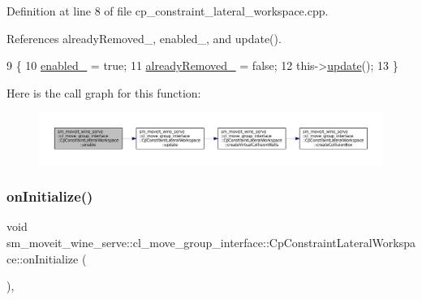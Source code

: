 Definition at line 8 of file cp\+\_\+constraint\+\_\+lateral\+\_\+workspace.\+cpp.



References already\+Removed\+\_\+, enabled\+\_\+, and update().


\begin{DoxyCode}
9         \{
10             \hyperlink{classsm__moveit__wine__serve_1_1cl__move__group__interface_1_1CpConstraintLateralWorkspace_a98fd9192d4b36e1b416ce7d90536c8de}{enabled\_} = \textcolor{keyword}{true};
11             \hyperlink{classsm__moveit__wine__serve_1_1cl__move__group__interface_1_1CpConstraintLateralWorkspace_aa48cf2bb345e79ba15e0f221f26f7df5}{alreadyRemoved\_} = \textcolor{keyword}{false};
12             this->\hyperlink{classsm__moveit__wine__serve_1_1cl__move__group__interface_1_1CpConstraintLateralWorkspace_a76692ba49429efb9e704cd8fdcf6ec0b}{update}();
13         \}
\end{DoxyCode}
Here is the call graph for this function\+:
\nopagebreak
\begin{figure}[H]
\begin{center}
\leavevmode
\includegraphics[width=350pt]{classsm__moveit__wine__serve_1_1cl__move__group__interface_1_1CpConstraintLateralWorkspace_a162757c8626fed8ddab25ddb85f97ae5_cgraph}
\end{center}
\end{figure}
\mbox{\label{classsm__moveit__wine__serve_1_1cl__move__group__interface_1_1CpConstraintLateralWorkspace_ab9fdca51abefbd7f99a4f9e858e3db7f}} 
\subsubsection{\texorpdfstring{on\+Initialize()}{onInitialize()}}
{\footnotesize\ttfamily void sm\+\_\+moveit\+\_\+wine\+\_\+serve\+::cl\+\_\+move\+\_\+group\+\_\+interface\+::\+Cp\+Constraint\+Lateral\+Workspace\+::on\+Initialize (\begin{DoxyParamCaption}{ }\end{DoxyParamCaption})\hspace{0.3cm}{\ttfamily [override]}, {\ttfamily [virtual]}}



